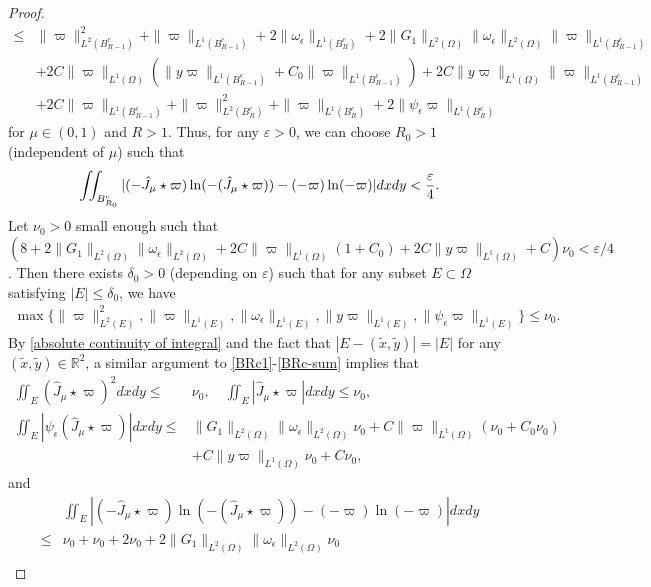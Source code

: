 \documentclass[1 [leqno, 11pt]{amsart}
\numberwithin{equation}{section}
\let\ep=\epsilon
\begin{document}
\begin{CJK*}{GBK}{song}
\begin{appendix}
\begin{proof}
\begin{align}
\leq&\|\varpi\|_{L^2(B_{R-1}^c)}^2+\|\varpi\|_{L^1(B_{R-1}^c)}+2\|\omega_\ep\|_{L^1(B_R^c)}+2\|G_1\|_{L^2(\Omega)} \|\omega_\ep\|_{L^2(\Omega)}\|\varpi\|_{L^1(B_{R-1}^c)}\\\nonumber
&+2C\|\varpi\|_{L^1(\Omega)}(\|y\varpi\|_{L^1(B_{R-1}^c)}+C_0\|\varpi\|_{L^1(B_{R-1}^c)})
+2C\|y\varpi\|_{L^1(\Omega)}\|\varpi\|_{L^1(B_{R-1}^c)}\\\label{BRc-sum}
&+2C\|\varpi\|_{L^1(B_{R-1}^c)}+\|\varpi\|_{L^2(B_{R}^c)}^2+\|\varpi\|_{L^1(B_{R}^c)}+2\|\psi_\ep\varpi\|_{L^1(B_{R}^c)}
\end{align}
for $\mu\in(0,1)$ and $R>1$. Thus, for any $\varepsilon>0$, we can choose  $R_0>1$ (independent of $\mu$) such that
\begin{align}\label{R-varepsilon}
\iint_{B_{R_0}^c}|(-\hat J_{\mu}\star\varpi)\ln(-(\hat J_{\mu}\star\varpi))-(-\varpi)\ln(-\varpi)|dxdy<{\varepsilon\over 4}.
\end{align}
Let $\nu_0>0$ small enough such that $(8+2\|G_1\|_{L^2(\Omega)} \|\omega_\ep\|_{L^2(\Omega)}+2C\|\varpi\|_{L^1(\Omega)}(1+C_0)
+2C\|y\varpi\|_{L^1(\Omega)}+C)\nu_0<\varepsilon/4$. Then there exists $\delta_0>0$ (depending on $\varepsilon$) such that for any subset $E\subset \Omega$ satisfying $|E|\leq\delta_0$, we have
\begin{align}\label{absolute continuity of integral}
\max\{\|\varpi\|_{L^2(E)}^2,\|\varpi\|_{L^1(E)},\|\omega_\ep\|_{L^1(E)},\|y\varpi\|_{L^1(E)},\|\psi_\ep\varpi\|_{L^1(E)}\}\leq \nu_0.
\end{align}
By \eqref{absolute continuity of integral} and the fact that $|E-(\tilde x,\tilde y)|=|E|$ for any $(\tilde x,\tilde y)\in \mathbb{R}^2$, a similar argument to \eqref{BRc1}-\eqref{BRc-sum} implies that
\begin{align*}
\iint_{E}(\hat J_{\mu}\star\varpi)^2dxdy\leq& \nu_0,\quad \iint_{E}|\hat J_{\mu}\star\varpi|dxdy\leq \nu_0,\\
\iint_{E}|\psi_\ep(\hat J_{\mu}\star\varpi)|dxdy
\leq& \|G_1\|_{L^2(\Omega)} \|\omega_\ep\|_{L^2(\Omega)}\nu_0+C\|\varpi\|_{L^1(\Omega)}(\nu_0
+C_0\nu_0)\\
&+C\|y\varpi\|_{L^1(\Omega)}\nu_0+C\nu_0,
\end{align*} and
\begin{align}\nonumber
&\iint_{E}|(-\hat J_{\mu}\star\varpi)\ln(-(\hat J_{\mu}\star\varpi))-(-\varpi)\ln(-\varpi)|dxdy\\\nonumber
\leq&\nu_0+\nu_0+2\nu_0+2\|G_1\|_{L^2(\Omega)} \|\omega_\ep\|_{L^2(\Omega)}\nu_0\\\label{E-small}

\end{align}
\end{proof}
\end{appendix}
\end{CJK*}
\end{document}
